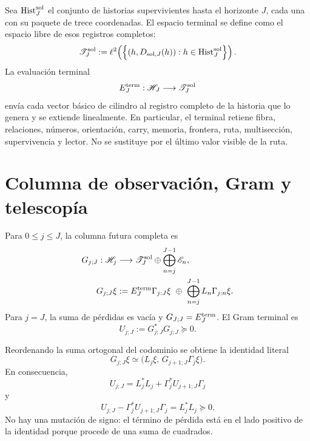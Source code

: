 Sea \(\operatorname{Hist}_{J}^{\rm sol}\) el conjunto de historias
supervivientes hasta el horizonte \(J\), cada una con su paquete de trece
coordenadas.  El espacio terminal se define como el espacio libre de esos
registros completos:
\begin{equation}\label{eq:pdfv2-sol-terminal-space}
 \mathscr T_J^{\rm sol}
 :=\ell^2\!\left(
 \left\{(h,D_{{\rm sol},J}(h)):
 h\in\operatorname{Hist}_{J}^{\rm sol}\right\}
 \right).
\end{equation}
La evaluación terminal
\begin{equation}\label{eq:pdfv2-sol-terminal-evaluation}
 E_J^{\rm term}:\mathscr H_J\longrightarrow\mathscr T_J^{\rm sol}
\end{equation}
envía cada vector básico de cilindro al registro completo de la historia que
lo genera y se extiende linealmente.  En particular, el terminal retiene
fibra, relaciones, números, orientación, carry, memoria, frontera, ruta,
multisección, supervivencia y lector.  No se sustituye por el último valor
visible de la ruta.

\section{Columna de observación, Gram y telescopía}
\label{sec:pdfv2-sol-gram}

Para \(0\leq j\leq J\), la columna futura completa es
\begin{equation}\label{eq:pdfv2-sol-g-column}
 \begin{aligned}
 G_{j;J}:\mathscr H_j&\longrightarrow
 \mathscr T_J^{\rm sol}\oplus
 \bigoplus_{n=j}^{J-1}\mathscr E_n,\\
 G_{j;J}\xi
 &:={}
 E_J^{\rm term}\Gamma_{j:J}\xi
 \ \oplus\ 
 \bigoplus_{n=j}^{J-1}L_n\Gamma_{j:n}\xi.
 \end{aligned}
\end{equation}
Para \(j=J\), la suma de pérdidas es vacía y
\(G_{J;J}=E_J^{\rm term}\).  El Gram terminal es
\begin{equation}\label{eq:pdfv2-sol-u-gram}
 U_{j;J}:=G_{j;J}^*G_{j;J}\succeq0.
\end{equation}

Reordenando la suma ortogonal del codominio se obtiene la identidad literal
\begin{equation}\label{eq:pdfv2-sol-g-recursion}
 G_{j;J}\xi
 \simeq
 \bigl(L_j\xi,\,G_{j+1;J}\Gamma_j\xi\bigr).
\end{equation}
En consecuencia,
\begin{equation}\label{eq:pdfv2-sol-stein}
 \boxed{U_{j;J}
 =L_j^*L_j+\Gamma_j^*U_{j+1;J}\Gamma_j}
\end{equation}
y
\begin{equation}\label{eq:pdfv2-sol-stein-difference}
 U_{j;J}-\Gamma_j^*U_{j+1;J}\Gamma_j
 =L_j^*L_j\succeq0.
\end{equation}
No hay una mutación de signo: el término de pérdida está en el lado positivo
de la identidad porque procede de una suma de cuadrados.

